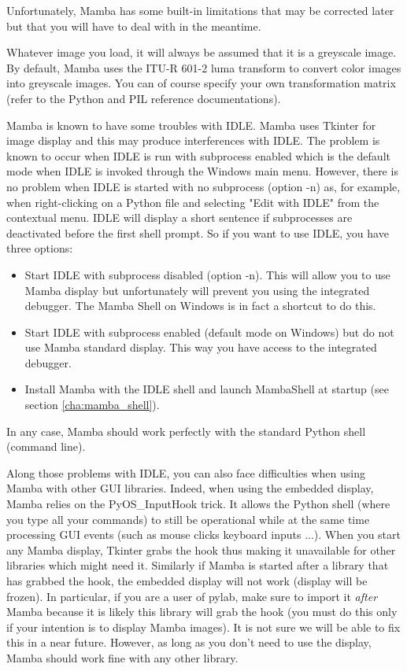 \documentclass[a4paper,10pt,oneside]{article}
\begin{document}
Unfortunately, Mamba has some built-in limitations that may be corrected later
but that you will have to deal with in the meantime.

Whatever image you load, it will always be assumed that it is a greyscale image.
By default, Mamba uses the ITU-R 601-2 luma transform to convert color images 
into greyscale images. You can of course specify your own transformation matrix 
(refer to the Python and PIL reference documentations).

Mamba is known to have some troubles with IDLE. Mamba uses
Tkinter for image display and this may produce interferences with IDLE. The
problem is known to occur when IDLE is run with subprocess enabled which is the
default mode when IDLE is invoked through the Windows main menu. However, there 
is no problem when IDLE is started with no subprocess (option -n) as, for 
example, when right-clicking on a Python file and selecting "Edit with IDLE" from
the contextual menu. IDLE will display a short sentence if subprocesses are
deactivated before the first shell prompt. So if you want to use IDLE, you have
three options:

\begin{itemize}
\item Start IDLE with subprocess disabled (option -n). This will allow you to 
use Mamba display but unfortunately will prevent you using the integrated
debugger. The Mamba Shell on Windows is in fact a shortcut to do this.
\item Start IDLE with subprocess enabled (default mode on Windows) but do not
use Mamba standard display. This way you have access to the integrated debugger.
\item Install Mamba with the IDLE shell and launch MambaShell at startup (see
section \ref{cha:mamba_shell}).
\end{itemize}

In any case, Mamba should work perfectly with the standard Python shell 
(command line).

Along those problems with IDLE, you can also face difficulties when using
Mamba with other GUI libraries. Indeed, when using the embedded display,
Mamba relies on the PyOS\_InputHook trick. It allows the Python shell (where 
you type all your commands) to still be operational while at the same time
processing GUI events (such as mouse clicks keyboard inputs ...). When you
start any Mamba display, Tkinter grabs the hook thus making it unavailable
for other libraries which might need it. Similarly if Mamba is started
after a library that has grabbed the hook, the embedded display will not
work (display will be frozen). In particular, if you are a user of pylab,
make sure to import it \textit{after} Mamba because it is likely
this library will grab the hook (you must do this only if your intention is to
display Mamba images). It is not sure we will be able to fix this in a near
future. However, as long as you don't need to use the display, Mamba should 
work fine with any other library.
\end{document}
